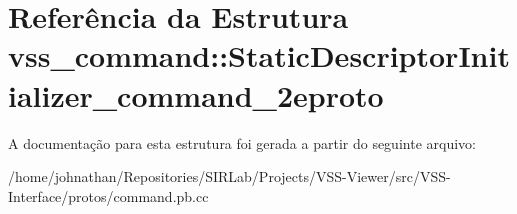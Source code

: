 \hypertarget{structvss__command_1_1StaticDescriptorInitializer__command__2eproto}{}\section{Referência da Estrutura vss\+\_\+command\+:\+:Static\+Descriptor\+Initializer\+\_\+command\+\_\+2eproto}
\label{structvss__command_1_1StaticDescriptorInitializer__command__2eproto}


A documentação para esta estrutura foi gerada a partir do seguinte arquivo\+:\begin{DoxyCompactItemize}
\item 
/home/johnathan/\+Repositories/\+S\+I\+R\+Lab/\+Projects/\+V\+S\+S-\/\+Viewer/src/\+V\+S\+S-\/\+Interface/protos/command.\+pb.\+cc\end{DoxyCompactItemize}
